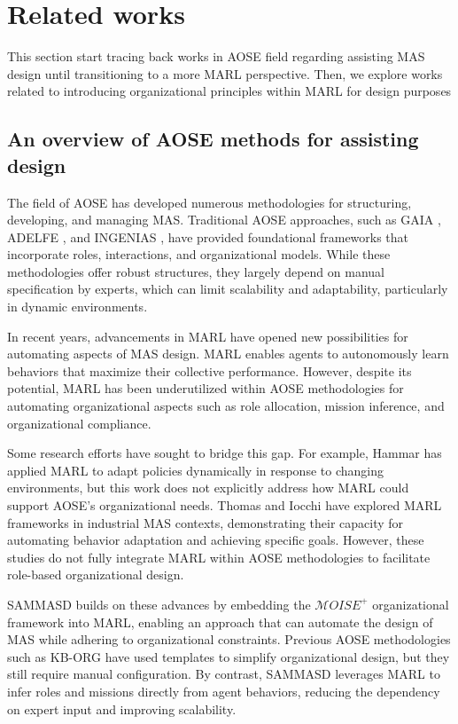 \documentclass[sigconf,anonymous]{aamas}
\begin{document}
\section{Related works}

This section start tracing back works in AOSE field regarding assisting MAS design until transitioning to a more MARL perspective. Then, we explore works related to introducing organizational principles within MARL for design purposes

\subsection{An overview of AOSE methods for assisting design}

The field of AOSE has developed numerous methodologies for structuring, developing, and managing MAS. Traditional AOSE approaches, such as GAIA \cite{gaia1998}, ADELFE \cite{adelfe2002}, and INGENIAS \cite{ingenias2004}, have provided foundational frameworks that incorporate roles, interactions, and organizational models. While these methodologies offer robust structures, they largely depend on manual specification by experts, which can limit scalability and adaptability, particularly in dynamic environments.

In recent years, advancements in MARL have opened new possibilities for automating aspects of MAS design. MARL enables agents to autonomously learn behaviors that maximize their collective performance. However, despite its potential, MARL has been underutilized within AOSE methodologies for automating organizational aspects such as role allocation, mission inference, and organizational compliance.

Some research efforts have sought to bridge this gap. For example, Hammar \cite{hammar2019} has applied MARL to adapt policies dynamically in response to changing environments, but this work does not explicitly address how MARL could support AOSE's organizational needs. Thomas \cite{thomas2023} and Iocchi \cite{iocchi2023} have explored MARL frameworks in industrial MAS contexts, demonstrating their capacity for automating behavior adaptation and achieving specific goals. However, these studies do not fully integrate MARL within AOSE methodologies to facilitate role-based organizational design.

SAMMASD builds on these advances by embedding the $\mathcal{M}OISE^+$ organizational framework into MARL, enabling an approach that can automate the design of MAS while adhering to organizational constraints. Previous AOSE methodologies such as KB-ORG \cite{kborg2001} have used templates to simplify organizational design, but they still require manual configuration. By contrast, SAMMASD leverages MARL to infer roles and missions directly from agent behaviors, reducing the dependency on expert input and improving scalability.
\end{document}
